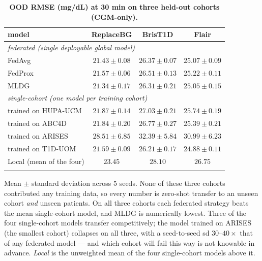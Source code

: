 \documentclass[10pt,letterpaper]{article}
\newlength\savedwidth
\newcommand\thickhline{\noalign{\global\savedwidth\arrayrulewidth\global\arrayrulewidth 2pt}%
\hline
\noalign{\global\arrayrulewidth\savedwidth}}
\begin{document}
\begin{table}[!ht]
\centering
\captionsetup{justification=centering,singlelinecheck=on}
\caption{\bf OOD RMSE (mg/dL) at 30 min on three held-out cohorts (CGM-only).}
\label{tab:ood}
\begin{tabular}{lccc}
\thickhline
model & ReplaceBG & BrisT1D & Flair \\
\hline
\multicolumn{4}{l}{\emph{federated (single deployable global model)}} \\
FedAvg  & $21.43 \pm 0.08$ & $26.37 \pm 0.07$ & $25.07 \pm 0.09$ \\
FedProx & $21.57 \pm 0.06$ & $26.51 \pm 0.13$ & $25.22 \pm 0.11$ \\
MLDG    & $\mathbf{21.34 \pm 0.17}$ & $\mathbf{26.31 \pm 0.21}$ & $\mathbf{25.05 \pm 0.15}$ \\
\hline
\multicolumn{4}{l}{\emph{single-cohort (one model per training cohort)}} \\
\;trained on HUPA-UCM & $21.87 \pm 0.14$ & $27.03 \pm 0.21$ & $25.74 \pm 0.19$ \\
\;trained on ABC4D    & $21.84 \pm 0.20$ & $26.77 \pm 0.27$ & $25.39 \pm 0.21$ \\
\;trained on ARISES   & $28.51 \pm 6.85$ & $32.39 \pm 5.84$ & $30.99 \pm 6.23$ \\
\;trained on T1D-UOM  & $21.59 \pm 0.09$ & $26.21 \pm 0.17$ & $24.88 \pm 0.11$ \\
Local (mean of the four) & $23.45$ & $28.10$ & $26.75$ \\
\thickhline
\end{tabular}
\begin{center}
{\small Mean $\pm$ standard deviation across 5 seeds. None of these three cohorts
contributed any training data, so every number is zero-shot transfer to an unseen
cohort \emph{and} unseen patients. On all three cohorts each federated strategy
beats the mean single-cohort model, and MLDG is numerically lowest. Three of the
four single-cohort models transfer competitively; the model trained on ARISES
(the smallest cohort) collapses on all three, with a seed-to-seed sd $30$--$40
\times$ that of any federated model --- and which cohort will fail this way is not
knowable in advance. \emph{Local} is the unweighted mean of the four
single-cohort models above it.}
\end{center}
\end{table}
\end{document}
